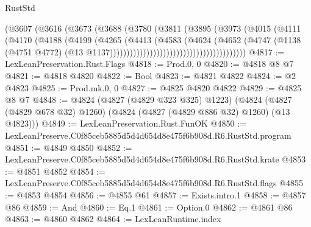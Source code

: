 \begin{lexlean}{RustStd}
\begin{coremodule}
                                            (@3607
                                              (@3616
                                                (@3673
                                                  (@3688
                                                    (@3780
                                                      (@3811
                                                        (@3895
                                                          (@3973
                                                            (@4015
                                                              (@4111
                                                                (@4170
                                                                  (@4188
                                                                    (@4199
                                                                      (@4265
                                                                        (@4413
                                                                          (@4583
                                                                            (@4624
                                                                              (@4652
                                                                                (@4747
                                                                                  (@1138
                                                                                    (@4751 @4772)
                                                                                    (@13
                                                                                      @1137)))))))))))))))))))))))))))))))))))))))))
@4817 := LexLeanPreservation.Rust.Flags
@4818 := Prod.{0, 0}
@4820 := @4818 @8 @7
@4821 := @4818 @4820
@4822 := Bool
@4823 := @4821 @4822
@4824 := @2 @4823
@4825 := Prod.mk.{0, 0}
@4827 := @4825 @4820 @4822
@4829 := @4825 @8 @7
@4848 := @4824
    (@4827 (@4829 @323 @325) @1223)
    (@4824 (@4827 (@4829 @678 @32) @1260) (@4824 (@4827 (@4829 @886 @32) @1260) (@13 @4823)))
@4849 := LexLeanPreservation.Rust.FunOK
@4850 := LexLeanPreserve.C0f85ceb5885d5d4d654d8e475f6b908d.R6.RustStd.program
@4851 := @4849 @4850
@4852 := LexLeanPreserve.C0f85ceb5885d5d4d654d8e475f6b908d.R6.RustStd.krate
@4853 := @4851 @4852
@4854 := LexLeanPreserve.C0f85ceb5885d5d4d654d8e475f6b908d.R6.RustStd.flags
@4855 := @4853 @4854
@4856 := @4855 @61
@4857 := Exists.intro.{1}
@4858 := @4857 @86
@4859 := And
@4860 := Eq.{1}
@4861 := Option.{0}
@4862 := @4861 @86
@4863 := @4860 @4862
@4864 := LexLeanRuntime.index

\end{coremodule}
\end{lexlean}
